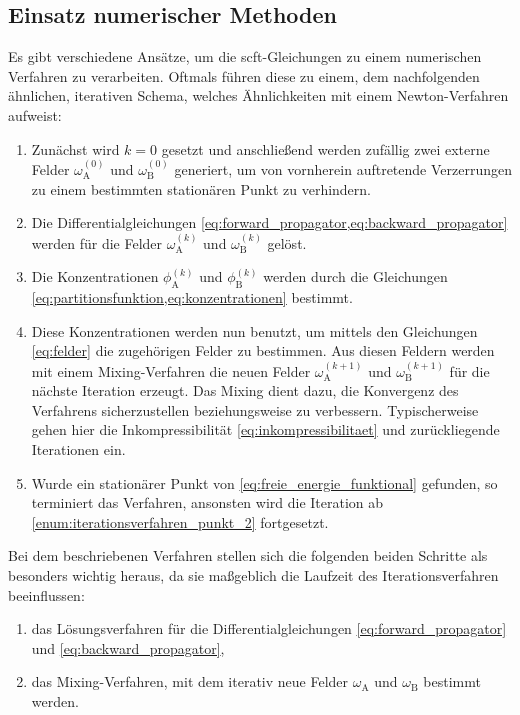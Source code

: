 \documentclass[../main.tex]{subfiles}
\begin{document}
\subsection*{Einsatz numerischer Methoden} %

Es gibt verschiedene Ansätze, um die \ac{scft}-Gleichungen zu einem numerischen Verfahren zu verarbeiten.
Oftmals führen diese zu einem, dem nachfolgenden ähnlichen, iterativen Schema, welches Ähnlichkeiten mit einem Newton-Verfahren aufweist:

\begin{enumerate}[label={\itshape\roman*.},ref={\itshape\roman*}]
    \item Zunächst wird $k = 0$ gesetzt und anschließend werden zufällig zwei externe Felder $\omega^{(0)}_{\mathrm{A}}$ und $\omega^{(0)}_{\mathrm{B}}$ generiert, um von vornherein auftretende Verzerrungen zu einem bestimmten stationären Punkt zu verhindern.
    \item\label{enum:iterationsverfahren_punkt_2} Die Differentialgleichungen \cref{eq:forward_propagator,eq:backward_propagator} werden für die Felder $\omega^{(k)}_{\mathrm{A}}$ und $\omega^{(k)}_{\mathrm{B}}$ gelöst.
    \item Die Konzentrationen $\phi^{(k)}_{\mathrm{A}}$ und $\phi^{(k)}_{\mathrm{B}}$ werden durch die Gleichungen \cref{eq:partitionsfunktion,eq:konzentrationen} bestimmt.
    \item Diese Konzentrationen werden nun benutzt, um mittels den Gleichungen \cref{eq:felder} die zugehörigen Felder zu bestimmen.
    Aus diesen Feldern werden mit einem Mixing-Verfahren die neuen Felder $\omega^{(k+1)}_{\mathrm{A}}$ und $\omega^{(k+1)}_{\mathrm{B}}$ für die nächste Iteration erzeugt.
    Das Mixing dient dazu, die Konvergenz des Verfahrens sicherzustellen beziehungsweise zu verbessern.
    Typischerweise gehen hier die Inkompressibilität \cref{eq:inkompressibilitaet} und zurückliegende Iterationen ein.
    \item Wurde ein stationärer Punkt von \cref{eq:freie_energie_funktional} gefunden, so terminiert das Verfahren, ansonsten wird die Iteration ab \cref{enum:iterationsverfahren_punkt_2} fortgesetzt.
\end{enumerate}
%
Bei dem beschriebenen Verfahren stellen sich die folgenden beiden Schritte als besonders wichtig heraus, da sie maßgeblich die Laufzeit des Iterationsverfahren beeinflussen:
\begin{enumerate}[label={\itshape\roman*.}]
    \item das Lösungsverfahren für die Differentialgleichungen \cref{eq:forward_propagator} und \cref{eq:backward_propagator},
    \item das Mixing-Verfahren, mit dem iterativ neue Felder $\omega_{\mathrm{A}}$ und $\omega_{\mathrm{B}}$ bestimmt werden.
\end{enumerate}
\end{document}
